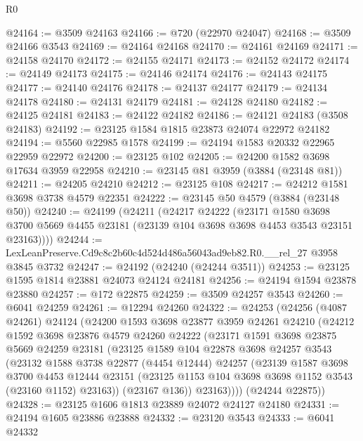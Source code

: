 \begin{lexlean}{R0}
\begin{coremodule}
@24164 := @3509 @24163
@24166 := @720 (@22970 @24047)
@24168 := @3509 @24166 @3543
@24169 := @24164 @24168
@24170 := @24161 @24169
@24171 := @24158 @24170
@24172 := @24155 @24171
@24173 := @24152 @24172
@24174 := @24149 @24173
@24175 := @24146 @24174
@24176 := @24143 @24175
@24177 := @24140 @24176
@24178 := @24137 @24177
@24179 := @24134 @24178
@24180 := @24131 @24179
@24181 := @24128 @24180
@24182 := @24125 @24181
@24183 := @24122 @24182
@24186 := @24121 @24183 (@3508 @24183)
@24192 := @23125 @1584 @1815 @23873 @24074 @22972 @24182
@24194 := @5560 @22985 @1578
@24199 := @24194 @1583 @20332 @22965 @22959 @22972
@24200 := @23125 @102
@24205 := @24200 @1582 @3698 @17634 @3959 @22958
@24210 := @23145 @81 @3959 (@3884 (@23148 @81))
@24211 := @24205 @24210
@24212 := @23125 @108
@24217 := @24212 @1581 @3698 @3738 @4579 @22351
@24222 := @23145 @50 @4579 (@3884 (@23148 @50))
@24240 := @24199
    (@24211
      (@24217
        @24222
        (@23171
          @1580
          @3698
          @3700
          @5669
          @4455
          @23181
          (@23139 @104 @3698 @3698 @4453 @3543 @23151 @23163))))
@24244 := LexLeanPreserve.Cd9c8c2b60c4d524d486a56043ad9eb82.R0.__rel_27 @3958 @3845 @3732
@24247 := @24192 (@24240 (@24244 @3511))
@24253 := @23125 @1595 @1814 @23881 @24073 @24124 @24181
@24256 := @24194 @1594 @23878 @23880
@24257 := @172 @22875
@24259 := @3509 @24257 @3543
@24260 := @6041 @24259
@24261 := @12294 @24260
@24322 := @24253
    (@24256
      (@4087 @24261)
      @24124
      (@24200
        @1593
        @3698
        @23877
        @3959
        @24261
        @24210
        (@24212
          @1592
          @3698
          @23876
          @4579
          @24260
          @24222
          (@23171
            @1591
            @3698
            @23875
            @5669
            @24259
            @23181
            (@23125
              @1589
              @104
              @22878
              @3698
              @24257
              @3543
              (@23132
                @1588
                @3738
                @22877
                (@4454 @12444)
                @24257
                (@23139
                  @1587
                  @3698
                  @3700
                  @4453
                  @12444
                  @23151
                  (@23125 @1153 @104 @3698 @3698 @1152 @3543 (@23160 @1152) @23163))
                (@23167 @136))
              @23163))))
      (@24244 @22875))
@24328 := @23125 @1606 @1813 @23889 @24072 @24127 @24180
@24331 := @24194 @1605 @23886 @23888
@24332 := @23120 @3543
@24333 := @6041 @24332

\end{coremodule}
\end{lexlean}
